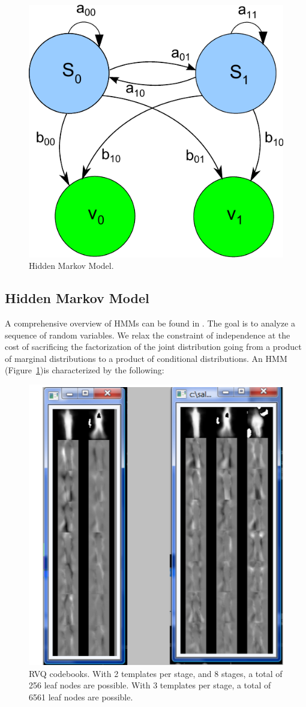 \documentclass{article}
\begin{document}
			\begin{figure}				
					\includegraphics[width=.30\textwidth]{figs/RVQ_HMM_IPCV2010_HMMblockDiagram}
					\centering
					\caption{Hidden Markov Model.}
					\label{fig:HMM}
			\end{figure}
			
\subsection{Hidden Markov Model}
A comprehensive overview of HMMs can be found in \cite{1989_JNL_TutorialHMM_Rabiner}.  The goal is to analyze a sequence of random variables.  We relax the constraint of independence at the cost of sacrificing the factorization of the joint distribution going from a product of marginal distributions to a product of conditional distributions.  An HMM (Figure~\ref{fig:HMM})is characterized by the following:  

					\begin{figure}				
					\includegraphics[width=.50\textwidth]{figs/RVQ_HMM_IPCV2010_codebooks}
					\centering
					\caption{RVQ codebooks.  With 2 templates per stage, and 8 stages, a total of 256 leaf nodes are possible.  With 3 templates per stage, a total of 6561 leaf nodes are possible.}
					\label{fig:codebooks}
			\end{figure}	
\end{document}
